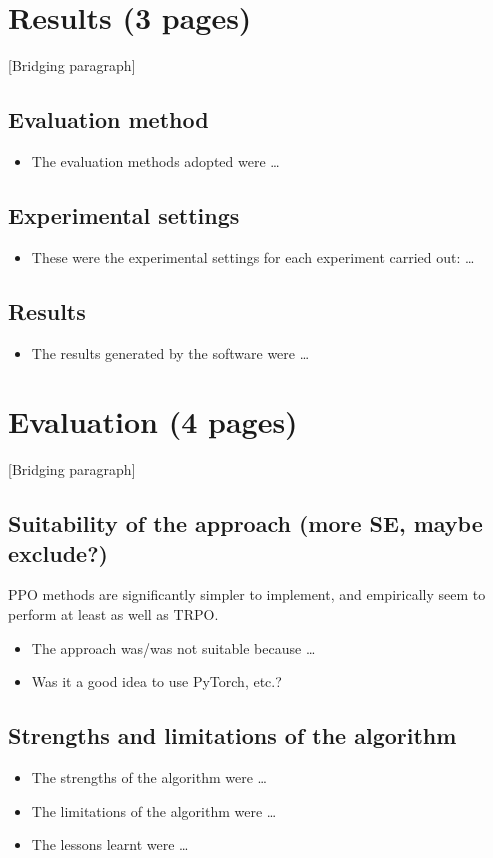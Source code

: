 \documentclass[12pt,a4paper]{article}
\begin{document}
\newpage
\section{Results (3 pages)}
[Bridging paragraph]
\subsection{Evaluation method}
\begin{itemize}
    \item The evaluation methods adopted were \dots
\end{itemize}

\subsection{Experimental settings}
\begin{itemize}
    \item These were the experimental settings for each experiment carried out: \dots
\end{itemize}

\subsection{Results}
\begin{itemize}
    \item The results generated by the software were \dots
\end{itemize}

\newpage
\section{Evaluation (4 pages)}
[Bridging paragraph]
\subsection{Suitability of the approach (more SE, maybe exclude?)}
PPO methods are significantly simpler to implement, and empirically seem to perform at least as well as TRPO.
\begin{itemize}
    \item The approach was/was not suitable because \dots
    \item Was it a good idea to use PyTorch, etc.?
\end{itemize}

\subsection{Strengths and limitations of the algorithm} 
\begin{itemize}
    \item The strengths of the algorithm were \dots
    \item The limitations of the algorithm were \dots
    \item The lessons learnt were \dots
\end{itemize}
\end{document}
